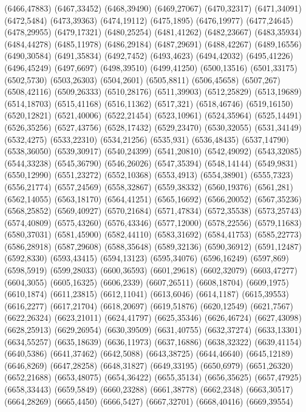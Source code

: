 (6466,47883)
(6467,33452)
(6468,39490)
(6469,27067)
(6470,32317)
(6471,34091)
(6472,5484)
(6473,39363)
(6474,19112)
(6475,1895)
(6476,19977)
(6477,24645)
(6478,29955)
(6479,17321)
(6480,25254)
(6481,41262)
(6482,23667)
(6483,35934)
(6484,44278)
(6485,11978)
(6486,29184)
(6487,29691)
(6488,42267)
(6489,16556)
(6490,30584)
(6491,35834)
(6492,7452)
(6493,4623)
(6494,42032)
(6495,41226)
(6496,45249)
(6497,6697)
(6498,39510)
(6499,41250)
(6500,13516)
(6501,33175)
(6502,5730)
(6503,26303)
(6504,2601)
(6505,8811)
(6506,45658)
(6507,267)
(6508,42116)
(6509,26333)
(6510,28176)
(6511,39903)
(6512,25829)
(6513,19689)
(6514,18703)
(6515,41168)
(6516,11362)
(6517,321)
(6518,46746)
(6519,16150)
(6520,12821)
(6521,40006)
(6522,21454)
(6523,10961)
(6524,35964)
(6525,14491)
(6526,35256)
(6527,43756)
(6528,17432)
(6529,23470)
(6530,32055)
(6531,34149)
(6532,4275)
(6533,22310)
(6534,21256)
(6535,931)
(6536,48435)
(6537,14790)
(6538,36050)
(6539,30917)
(6540,24399)
(6541,20810)
(6542,49092)
(6543,32085)
(6544,33238)
(6545,36790)
(6546,26026)
(6547,35394)
(6548,14144)
(6549,9831)
(6550,12990)
(6551,23272)
(6552,10368)
(6553,4913)
(6554,38901)
(6555,7323)
(6556,21774)
(6557,24569)
(6558,32867)
(6559,38332)
(6560,19376)
(6561,281)
(6562,14055)
(6563,18170)
(6564,41251)
(6565,16692)
(6566,20052)
(6567,35236)
(6568,25852)
(6569,40927)
(6570,21684)
(6571,47834)
(6572,35538)
(6573,25743)
(6574,40809)
(6575,43260)
(6576,43346)
(6577,12000)
(6578,22556)
(6579,11683)
(6580,37031)
(6581,45900)
(6582,44110)
(6583,31692)
(6584,41753)
(6585,22773)
(6586,28918)
(6587,29608)
(6588,35648)
(6589,32136)
(6590,36912)
(6591,12487)
(6592,8330)
(6593,43415)
(6594,13123)
(6595,34076)
(6596,16249)
(6597,869)
(6598,5919)
(6599,28033)
(6600,36593)
(6601,29618)
(6602,32079)
(6603,47277)
(6604,3055)
(6605,16325)
(6606,2339)
(6607,26511)
(6608,18704)
(6609,1975)
(6610,1874)
(6611,23815)
(6612,11041)
(6613,6046)
(6614,1187)
(6615,39553)
(6616,2277)
(6617,21704)
(6618,20697)
(6619,51876)
(6620,12549)
(6621,7567)
(6622,26324)
(6623,21011)
(6624,41797)
(6625,35346)
(6626,46724)
(6627,43098)
(6628,25913)
(6629,26954)
(6630,39509)
(6631,40755)
(6632,37274)
(6633,13301)
(6634,55257)
(6635,18639)
(6636,11973)
(6637,16886)
(6638,32322)
(6639,41154)
(6640,5386)
(6641,37462)
(6642,5088)
(6643,38725)
(6644,46640)
(6645,12189)
(6646,8269)
(6647,28258)
(6648,31827)
(6649,33195)
(6650,6979)
(6651,26320)
(6652,21688)
(6653,48075)
(6654,36422)
(6655,35134)
(6656,35625)
(6657,47925)
(6658,33443)
(6659,5849)
(6660,23288)
(6661,38778)
(6662,2348)
(6663,30517)
(6664,28269)
(6665,4450)
(6666,5427)
(6667,32701)
(6668,40416)
(6669,39554)
